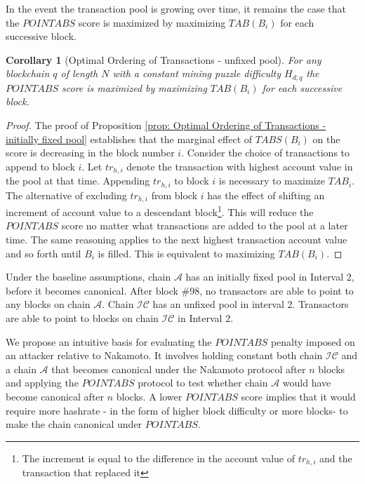 \documentclass[11pt]{article}
\theoremstyle{plain}
\newtheorem{corollary}{Corollary}[proposition]
\begin{document}
In the event the transaction pool is growing over time, it remains the case that the $POINTABS$ score is maximized by maximizing  $TAB(B_{i})$ for each successive block.

\begin{corollary}[Optimal Ordering of Transactions -  unfixed pool]
\label{cor: Optimal Ordering of Transactions-  unfixed pool}
For any blockchain $q$ of length $N$ with a constant mining puzzle difficulty $H_{d;q}$ the $POINTABS$ score is maximized by maximizing $TAB(B_{i})$ for each successive block.
\end{corollary}

\begin{proof}
The proof of Proposition \ref{prop: Optimal Ordering of Transactions - initially fixed pool} establishes that the marginal effect of $TABS(B_{i})$ on the score is decreasing in the block number $i$. Consider the choice of transactions to append to block $i$. Let $tr_{h,i}$ denote the transaction with highest account value in the pool at that time. Appending $tr_{h,i}$ to block $i$ is necessary to maximize $TAB_{i}$. The alternative of excluding $tr_{h,i}$ from block $i$ has the effect of shifting an increment of account value to a descendant block\footnote{The increment is equal to the difference in the account value of $tr_{h,i}$ and the transaction that replaced it}. This will reduce the $POINTABS$ score no matter what transactions are added to the pool at a later time. The same reasoning applies to the next highest transaction account value and so forth until $B_{i}$ is filled. This is equivalent to maximizing $TAB(B_{i})$. 
\end{proof}

Under the baseline assumptions, chain $\mathcal{A}$ has an initially fixed pool in Interval 2, before it becomes canonical. After block \#98, no transactors are able to point to any blocks on chain $\mathcal{A}$. Chain $\mathcal{IC}$ has an unfixed pool in interval 2. Transactors are able to point to blocks on chain $\mathcal{IC}$ in Interval 2. 

We propose an intuitive basis for evaluating the $POINTABS$ penalty imposed on an attacker relative to Nakamoto. It involves holding constant both chain $\mathcal{IC}$ and a chain $\mathcal{A}$ that becomes canonical under the Nakamoto protocol after $n$ blocks and applying the $POINTABS$ protocol to test whether chain $\mathcal{A}$ would have become canonical after $n$ blocks. A lower $POINTABS$ score implies that it would require more hashrate - in the form of higher block difficulty or more blocks- to make the chain canonical under $POINTABS$.
\end{document}
